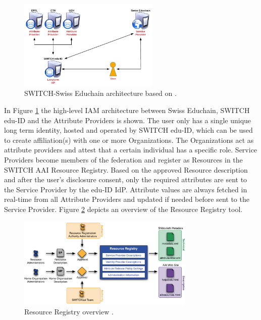 \begin{figure}[H]
	\centering
	\captionsetup{width=.75\linewidth}
	\includegraphics[width=0.6\textwidth]{figs/ch4/iam-diagram}
	\caption{SWITCH-Swiss Educhain architecture based on \cite{switch-eduid-architecture-presentation}.}
	\label{fig:iam-diagram}
\end{figure}

In Figure \ref{fig:iam-diagram} the high-level IAM architecture between Swiss Educhain, SWITCH edu-ID and the Attribute Providers is shown. The user only has a single unique long term identity, hosted and operated by SWITCH edu-ID, which can be used to create affiliation(s) with one or more Organizations. The Organizations act as attribute providers and attest that a certain individual has a specific role. Service Providers become members of the federation and register as Resources in the SWITCH AAI Resource Registry. Based on the approved Resource description and after the user's disclosure consent, only the required attributes are sent to the Service Provider by the edu-ID IdP. Attribute values are always fetched in real-time from all Attribute Providers and updated if needed before sent to the Service Provider. Figure \ref{fig:switch-resource-registry} depicts an overview of the Resource Registry tool. 

\begin{figure}[ht!]
	\centering
	\captionsetup{width=.75\linewidth}
	\includegraphics[width=0.75\textwidth]{figs/ch4/resource-registry}
	\caption{Resource Registry overview \cite{switch-resource-registry-info}.}
	\label{fig:switch-resource-registry}
\end{figure}

